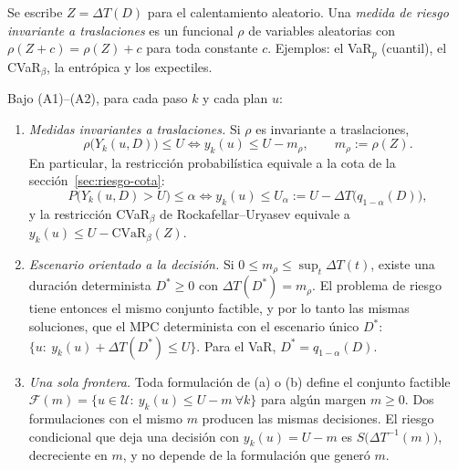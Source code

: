 Se escribe $Z=\Delta T(D)$ para el calentamiento aleatorio. Una \emph{medida de riesgo invariante
a traslaciones} es un funcional $\rho$ de variables aleatorias con $\rho(Z+c)=\rho(Z)+c$ para toda
constante $c$. Ejemplos: el VaR$_p$ (cuantil), el CVaR$_\beta$, la entrópica y los expectiles.

\begin{proposicion}\label{prop:margen}
Bajo (A1)--(A2), para cada paso $k$ y cada plan $u$:
\begin{enumerate}
\item[(a)] \emph{Medidas invariantes a traslaciones.} Si $\rho$ es invariante a traslaciones,
  \[\rho\big(Y_k(u,D)\big)\le U\iff y_k(u)\le U-m_\rho,\qquad m_\rho:=\rho(Z).\]
  En particular, la restricción probabilística equivale a la cota de la
  sección~\ref{sec:riesgo-cota}:
  \[P\big(Y_k(u,D)>U\big)\le\alpha\iff y_k(u)\le U_\alpha:=U-\Delta T\big(q_{1-\alpha}(D)\big),\]
  y la restricción CVaR$_\beta$ de Rockafellar--Uryasev equivale a
  $y_k(u)\le U-\mathrm{CVaR}_\beta(Z)$.
\item[(b)] \emph{Escenario orientado a la decisión.} Si $0\le m_\rho\le\sup_t\Delta T(t)$, existe
  una duración determinista $D^\ast\ge0$ con $\Delta T(D^\ast)=m_\rho$. El problema de
  riesgo tiene entonces el mismo conjunto factible, y por lo tanto las mismas soluciones, que el
  MPC determinista con el escenario único $D^\ast$:
  $\{u:\ y_k(u)+\Delta T(D^\ast)\le U\}$. Para el VaR, $D^\ast=q_{1-\alpha}(D)$.
\item[(c)] \emph{Una sola frontera.} Toda formulación de (a) o (b) define el conjunto factible
  $\mathcal F(m)=\{u\in\mathcal U:\ y_k(u)\le U-m\ \forall k\}$ para algún margen $m\ge0$. Dos
  formulaciones con el mismo $m$ producen las mismas decisiones. El riesgo condicional que deja
  una decisión con $y_k(u)=U-m$ es $S\big(\Delta T^{-1}(m)\big)$, decreciente en $m$, y no depende de
  la formulación que generó $m$.
\end{enumerate}
\end{proposicion}

